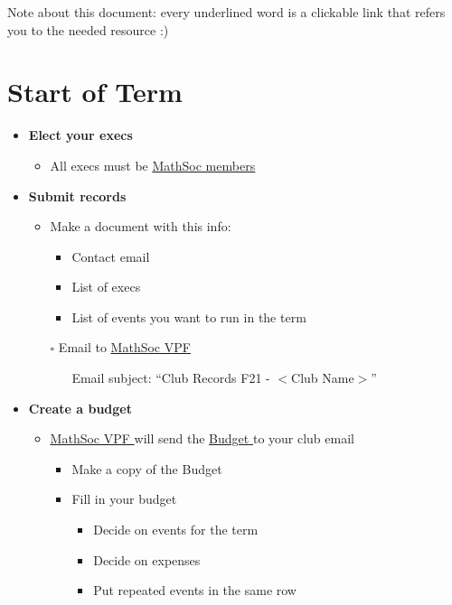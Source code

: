 \documentclass[utf8]{article}
\makeatletter
\newcommand{\termandyear}{F21 }
\newcommand{\budget}{\href{https://drive.google.com/file/d/1uQIh7Qp33NX0TgJhl3DdY-r2HqZzQKuZ/view}{\underline{Budget} }}
\newcommand{\MathSocVPF}{\href{mailto:vpf@mathsoc.uwaterloo.ca}{\underline{MathSoc VPF} }}
\newcommand{\membership}{\hyperref[sec:membership]{\underline{MathSoc members}}}
\makeatother
\begin{document}
\maketitle
Note about this document: every underlined word is a clickable link that refers you to the needed resource :)

\section*{Start of Term}
\begin{itemize}
    \item \textbf{Elect your execs}
    \begin{itemize}
        \item All execs must be \membership
    \end{itemize}
    \item \textbf{Submit records}
    \begin{itemize}
        \item Make a document with this info:
        \begin{itemize}
            \item Contact email
            \item List of execs
            \item List of events you want to run in the term
        \end{itemize}
        \item[$\square$] Email to \MathSocVPF 
        \begin{itemize}
            \item[\textperiodcentered] Email subject: ``Club Records \termandyear - $<$Club Name$>$''
        \end{itemize}
    \end{itemize}
    \item \textbf{Create a budget}
    \begin{itemize}
        \item \MathSocVPF will send the \budget to your club email
        \begin{itemize}
            \item Make a copy of the Budget
            \item Fill in your budget
            \begin{itemize}
                \item Decide on events for the term
                \item Decide on expenses
                \item Put repeated events in the same row

\end{itemize}
\end{itemize}
\end{itemize}
\end{itemize}
\end{document}
